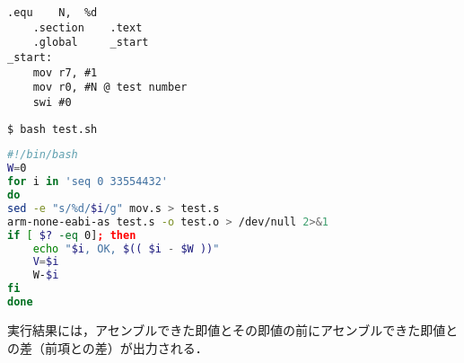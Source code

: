 \begin{center}
    \begin{minipage}[t]{0.34\textwidth}
        \centering
        \begin{lstlisting}[caption={{\ttfamily mov.s}変更後},label={src:mov2},frame={left}]
    .equ    N,  %d
    .section    .text
    .global     _start
_start:
    mov r7, #1
    mov r0, #N @ test number
    swi #0
    \end{lstlisting}
        \begin{lstlisting}[language={Bash},numbers={none},caption={実行},label={src:testexec},frame={leftline}]
$ bash test.sh          
    \end{lstlisting}
    \end{minipage}
    \hspace{2em}
    \begin{minipage}[t]{0.58\textwidth}
        \centering
        \begin{lstlisting}[language={Bash},caption={{\ttfamily test.sh}},label={src:test},frame={left}]
#!/bin/bash
W=0
for i in 'seq 0 33554432'
do
sed -e "s/%d/$i/g" mov.s > test.s
arm-none-eabi-as test.s -o test.o > /dev/null 2>&1
if [ $? -eq 0]; then
    echo "$i, OK, $(( $i - $W ))"
    V=$i
    W-$i
fi
done
    \end{lstlisting}
    \end{minipage}
\end{center}
実行結果には，アセンブルできた即値とその即値の前にアセンブルできた即値との差（前項との差）が出力される．
